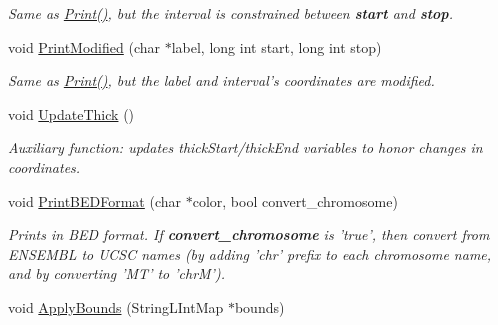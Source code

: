 \begin{CompactItemize}
\begin{CompactList}\small\item\em Same as \hyperlink{classGenomicRegionBED_ffbd8eb279f10f9b45189e2388fe7e89}{Print()}, but the interval is constrained between {\bf start} and {\bf stop}. \item\end{CompactList}\item 
\hypertarget{classGenomicRegionBED_aebba3c31c0fa88e594706f490030549}{
void \hyperlink{classGenomicRegionBED_aebba3c31c0fa88e594706f490030549}{PrintModified} (char $\ast$label, long int start, long int stop)}
\label{classGenomicRegionBED_aebba3c31c0fa88e594706f490030549}

\begin{CompactList}\small\item\em Same as \hyperlink{classGenomicRegionBED_ffbd8eb279f10f9b45189e2388fe7e89}{Print()}, but the label and interval's coordinates are modified. \item\end{CompactList}\item 
\hypertarget{classGenomicRegionBED_01bd886cfa67a3adae10c67dee941924}{
void \hyperlink{classGenomicRegionBED_01bd886cfa67a3adae10c67dee941924}{UpdateThick} ()}
\label{classGenomicRegionBED_01bd886cfa67a3adae10c67dee941924}

\begin{CompactList}\small\item\em Auxiliary function: updates thickStart/thickEnd variables to honor changes in coordinates. \item\end{CompactList}\item 
\hypertarget{classGenomicRegionBED_513fb071e2626be58837052daf86bab5}{
void \hyperlink{classGenomicRegionBED_513fb071e2626be58837052daf86bab5}{PrintBEDFormat} (char $\ast$color, bool convert\_\-chromosome)}
\label{classGenomicRegionBED_513fb071e2626be58837052daf86bab5}

\begin{CompactList}\small\item\em Prints in BED format. If {\bf convert\_\-chromosome} is 'true', then convert from ENSEMBL to UCSC names (by adding 'chr' prefix to each chromosome name, and by converting 'MT' to 'chrM'). \item\end{CompactList}\item 
\hypertarget{classGenomicRegionBED_5056b98f57933e2d24fd6d601f5499ef}{
void \hyperlink{classGenomicRegionBED_5056b98f57933e2d24fd6d601f5499ef}{ApplyBounds} (StringLIntMap $\ast$bounds)}
\label{classGenomicRegionBED_5056b98f57933e2d24fd6d601f5499ef}


\end{CompactItemize}
